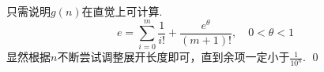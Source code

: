 \begin{pf} \rm \;
    只需说明$g(n)$在直觉上可计算.
    \[
        e = \sum_{i=0}^{m} \frac{1}{i!} + \frac{e^\theta}{(m+1)!}, \quad 0 < \theta < 1    
    \]
    显然根据$n$不断尝试调整展开长度即可，直到余项一定小于$\frac{1}{10^n}$.
    \qed
\end{pf}